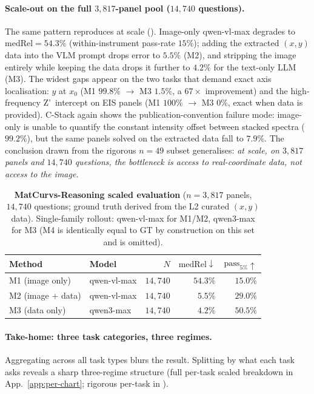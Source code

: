 \documentclass{article}
\begin{document}
\paragraph{Scale-out on the full $3{,}817$-panel pool ($14{,}740$ questions).}
The same pattern reproduces at scale ().
Image-only qwen-vl-max degrades to $\mathrm{medRel}{=}54.3\%$
(within-instrument pass-rate $15\%$); adding the extracted $(x,y)$
data into the VLM prompt drops error to $5.5\%$ (M2), and stripping
the image entirely while keeping the data drops it further to
$4.2\%$ for the text-only LLM (M3). The widest gaps appear on the
two tasks that demand exact axis localisation: $y$ at $x_{0}$ (M1
$99.8\%$ $\to$ M3 $1.5\%$, a $67\times$ improvement) and the
high-frequency Z'\ intercept on EIS panels (M1 $100\%$ $\to$ M3
$0\%$, exact when data is provided). C-Stack again shows the
publication-convention failure mode: image-only is unable to
quantify the constant intensity offset between stacked spectra
($99.2\%$), but the same panels solved on the extracted data fall
to $7.9\%$. The conclusion drawn from the rigorous $n{=}49$ subset
generalises: \emph{at scale, on $3{,}817$ panels and $14{,}740$
questions, the bottleneck is access to real-coordinate data, not
access to the image.}

\begin{table}[t]
\centering
\caption{\textbf{MatCurvs-Reasoning scaled evaluation}
($n{=}3{,}817$ panels, $14{,}740$ questions; ground truth derived
from the L2 curated $(x,y)$ data). Single-family rollout: qwen-vl-max
for M1/M2, qwen3-max for M3 (M4 is identically equal to GT by
construction on this set and is omitted).}
\label{tab:mr-scaled-headline}
\small
\begin{tabular}{llrrr}
\toprule
Method & Model & $N$ & $\mathrm{medRel}\downarrow$ & $\mathrm{pass}_{5\%}\uparrow$ \\
\midrule
M1 (image only)        & qwen-vl-max & $14{,}740$ & $54.3\%$ & $15.0\%$ \\
M2 (image $+$ data)    & qwen-vl-max & $14{,}740$ &  $5.5\%$ & $29.0\%$ \\
M3 (data only)         & qwen3-max   & $14{,}740$ &  $4.2\%$ & $50.5\%$ \\
\bottomrule
\end{tabular}
\end{table}

\paragraph{Take-home: three task categories, three regimes.}
Aggregating across all task types blurs the result. Splitting by
what each task asks reveals a sharp three-regime structure (full
per-task scaled breakdown in App.~\ref{app:per-chart};
rigorous per-task in ).
\end{document}
